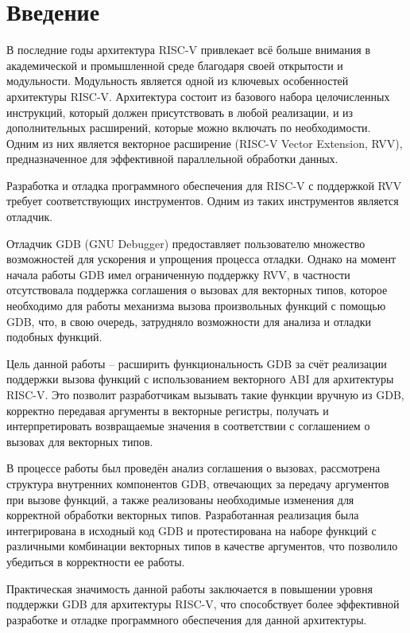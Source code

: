 \section{Введение}
\label{sec:Intro} 

В последние годы архитектура RISC-V привлекает всё больше внимания в академической и промышленной среде 
благодаря своей открытости и модульности. Модульность является одной из ключевых особенностей архитектуры
RISC-V. Архитектура состоит из базового набора целочисленных инструкций, который должен присутствовать
в любой реализации, и из дополнительных расширений, которые можно включать по необходимости. 
Одним из них является векторное расширение (RISC-V Vector Extension, RVV), предназначенное 
для эффективной параллельной обработки данных.

Разработка и отладка программного обеспечения для RISC-V с поддержкой RVV требует соответствующих инструментов.
Одним из таких инструментов является отладчик.

Отладчик GDB (GNU Debugger) предоставляет пользователю множество возможностей для ускорения и упрощения
процесса отладки. Однако на момент начала работы GDB имел ограниченную поддержку RVV, в частности
отсутствовала поддержка соглашения о вызовах для векторных типов, которое необходимо для
работы механизма вызова произвольных функций с помощью GDB, что, в свою очередь, затрудняло возможности
для анализа и отладки подобных функций.

Цель данной работы -- расширить функциональность GDB за счёт реализации поддержки вызова функций с 
использованием векторного ABI для архитектуры RISC-V. Это позволит разработчикам вызывать такие
функции вручную из GDB, корректно передавая аргументы в векторные регистры, получать и интерпретировать
возвращаемые значения в соответствии с соглашением о вызовах для векторных типов.

В процессе работы был проведён анализ соглашения о вызовах, рассмотрена структура внутренних компонентов GDB, 
отвечающих за передачу аргументов при вызове функций, а также реализованы необходимые изменения для корректной 
обработки векторных типов. Разработанная реализация была интегрирована в исходный код GDB и протестирована 
на наборе функций с различными комбинации векторных типов в качестве аргументов, что позволило убедиться 
в корректности ее работы.

Практическая значимость данной работы заключается в повышении уровня поддержки GDB для архитектуры RISC-V, 
что способствует более эффективной разработке и отладке программного обеспечения для данной архитектуры.

\newpage
